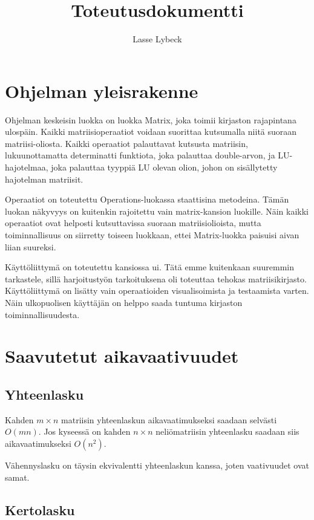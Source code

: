 \documentclass[10pt,a4paper,titlepage]{article}
\author{Lasse Lybeck}
\title{Toteutusdokumentti}
\newcommand{\pseudo}[1]{{\small}}
\begin{document}
\maketitle

\tableofcontents
\newpage

\section{Ohjelman yleisrakenne}

Ohjelman keskeisin luokka on luokka Matrix, joka toimii kirjaston rajapintana ulospäin. Kaikki matriisioperaatiot voidaan suorittaa 
kutsumalla niitä suoraan matriisi-oliosta. Kaikki operaatiot palauttavat kutsusta matriisin, lukuunottamatta determinatti
funktiota, joka palauttaa double-arvon, ja LU-hajotelmaa, joka palauttaa tyyppiä LU olevan olion, johon on sisällytetty
hajotelman matriisit.

Operaatiot on toteutettu Operations-luokassa staattisina metodeina. Tämän luokan näkyvyys on kuitenkin rajoitettu vain 
matrix-kansion luokille. Näin kaikki operaatiot ovat helposti kutsuttavissa suoraan matriisiolioista, mutta toiminnallisuus on
siirretty toiseen luokkaan, ettei Matrix-luokka paisuisi aivan liian suureksi.

Käyttöliittymä on toteutettu kansiossa ui. Tätä emme kuitenkaan suuremmin tarkastele, sillä harjoitustyön tarkoituksena oli
toteuttaa tehokas matriisikirjasto. Käyttöliittymä on lisätty vain operaatioiden visualisoimista ja testaamista varten.
Näin ulkopuolisen käyttäjän on helppo saada tuntuma kirjaston toiminnallisuudesta.


\section{Saavutetut aikavaativuudet}

\subsection{Yhteenlasku}

\pseudo{add}

Kahden $m\times n$ matriisin yhteenlaskun aikavaatimukseksi saadaan selvästi $O(mn)$.
Jos kyseessä on kahden $n\times n$ neliömatriisin yhteenlasku saadaan siis aikavaatimukseksi $O\left(n^2\right)$.

Vähennyslasku on täysin ekvivalentti yhteenlaskun kanssa, joten vaativuudet ovat samat.

\subsection{Kertolasku}
\end{document}
